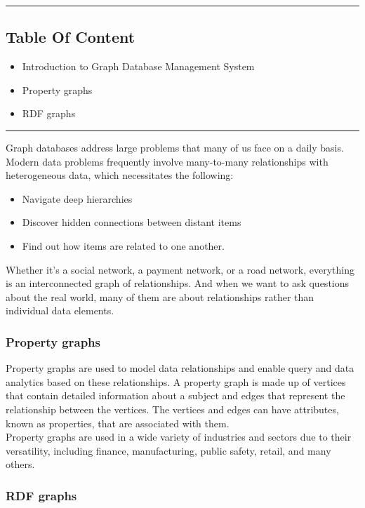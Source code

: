 \documentclass[12pt,a4paper]{article}
\begin{document}
\rule{\textwidth}{1pt}
    \begin{center}
        \section* {Table Of Content}
    \end{center}
  \begin{itemize}
    \item Introduction to Graph Database Management System
    \item Property graphs
    \item RDF graphs
  \end{itemize}

  \rule{\textwidth}{1pt}
  
\pagebreak

Graph databases address large problems that many of us face on a daily basis. Modern data problems frequently involve many-to-many relationships with heterogeneous data, which necessitates the following:
\begin{itemize}
    \item Navigate deep hierarchies
    \item Discover hidden connections between distant items
    \item Find out how items are related to one another.
  \end{itemize}
Whether it's a social network, a payment network, or a road network, everything is an interconnected graph of relationships. And when we want to ask questions about the real world, many of them are about relationships rather than individual data elements.
\pagebreak

\subsubsection*{Property graphs}
Property graphs are used to model data relationships and enable query and data analytics based on these relationships. A property graph is made up of vertices that contain detailed information about a subject and edges that represent the relationship between the vertices. The vertices and edges can have attributes, known as properties, that are associated with them.
\\
Property graphs are used in a wide variety of industries and sectors due to their versatility, including finance, manufacturing, public safety, retail, and many others.
\pagebreak

\subsubsection*{RDF graphs}
\end{document}
